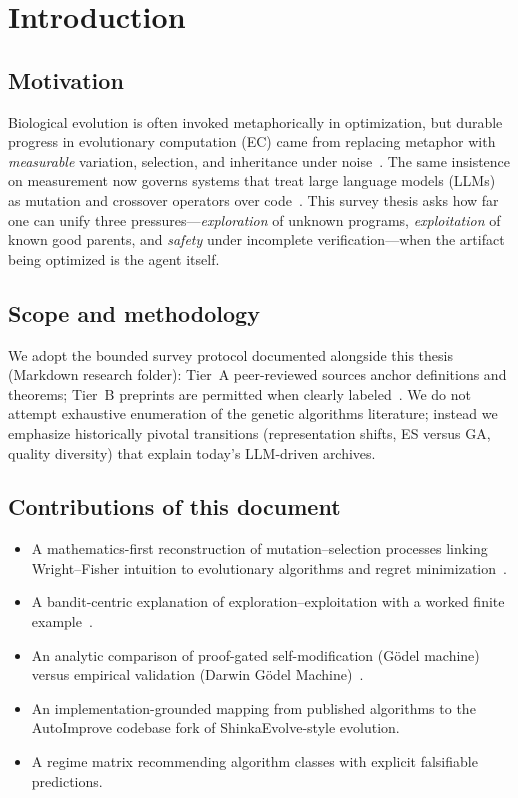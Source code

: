 \section{Introduction}

\subsection{Motivation}
Biological evolution is often invoked metaphorically in optimization, but durable progress in evolutionary computation (EC) came from replacing metaphor with \emph{measurable} variation, selection, and inheritance under noise~\cite{eiben2015introduction,dejong2006evolutionary}.
The same insistence on measurement now governs systems that treat large language models (LLMs) as mutation and crossover operators over code~\cite{lange2025shinka,zhang2025darwin}.
This survey thesis asks how far one can unify three pressures---\emph{exploration} of unknown programs, \emph{exploitation} of known good parents, and \emph{safety} under incomplete verification---when the artifact being optimized is the agent itself.

\subsection{Scope and methodology}
We adopt the bounded survey protocol documented alongside this thesis (Markdown research folder): Tier~A peer-reviewed sources anchor definitions and theorems; Tier~B preprints are permitted when clearly labeled~\cite{lange2025shinka,zhang2025darwin}.
We do not attempt exhaustive enumeration of the genetic algorithms literature; instead we emphasize historically pivotal transitions (representation shifts, ES versus GA, quality diversity) that explain today's LLM-driven archives.

\subsection{Contributions of this document}
\begin{itemize}
  \item A mathematics-first reconstruction of mutation--selection processes linking Wright--Fisher intuition to evolutionary algorithms and regret minimization~\cite{ewens2004mathematical,lai1985asymptotically}.
  \item A bandit-centric explanation of exploration--exploitation with a worked finite example~\cite{auer2002finite,russo2018tutorial}.
  \item An analytic comparison of proof-gated self-modification (G\"odel machine) versus empirical validation (Darwin G\"odel Machine)~\cite{schmidhuber2007godel,zhang2025darwin}.
  \item An implementation-grounded mapping from published algorithms to the AutoImprove codebase fork of ShinkaEvolve-style evolution.
  \item A regime matrix recommending algorithm classes with explicit falsifiable predictions.
\end{itemize}

